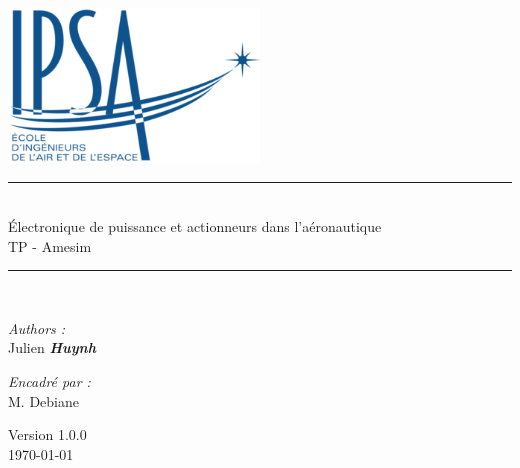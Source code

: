 \documentclass[a4paper,12pt,calibri,oneside,openany]{book}
\theoremstyle{break}
\begin{document}
\renewcommand{\bibname}{Bibliographie et Webographie}

\begin{titlepage}
\begin{center}

\includegraphics[width=0.5\textwidth]{ipsa}\\[1cm]



\rule{\linewidth}{0.5mm} \\[0.4cm]
{ \huge  Électronique de puissance et actionneurs dans l'aéronautique }\\
TP - Amesim
\rule{\linewidth}{0.5mm} \\[1.5cm]

\vspace{0.8cm}
\noindent
\begin{minipage}{0.4\textwidth}
  \begin{flushleft} \large
    \emph{Authors :}\\
   
    Julien \textbf{\textit{Huynh}}\\

  \end{flushleft}
\end{minipage}%
\begin{minipage}{0.4\textwidth}
  \begin{flushright} \large
    \emph{Encadré par :} \\
    M. Debiane\\
  \end{flushright}
\end{minipage}

\vfill

{\large Version 1.0.0\\ \today}

\end{center}
\end{titlepage}
\end{document}
